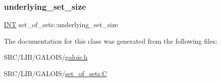 \subsubsection{\texorpdfstring{underlying\+\_\+set\+\_\+size}{underlying\_set\_size}}
{\footnotesize\ttfamily \mbox{\hyperlink{galois_8h_a09fddde158a3a20bd2dcadb609de11dc}{I\+NT}} set\+\_\+of\+\_\+sets\+::underlying\+\_\+set\+\_\+size}



The documentation for this class was generated from the following files\+:\begin{DoxyCompactItemize}
\item 
S\+R\+C/\+L\+I\+B/\+G\+A\+L\+O\+I\+S/\mbox{\hyperlink{galois_8h}{galois.\+h}}\item 
S\+R\+C/\+L\+I\+B/\+G\+A\+L\+O\+I\+S/\mbox{\hyperlink{set__of__sets_8_c}{set\+\_\+of\+\_\+sets.\+C}}\end{DoxyCompactItemize}
